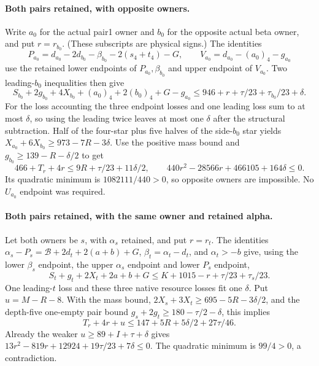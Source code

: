 \documentclass[11pt,letterpaper]{article}
\theoremstyle{definition}\newtheorem{definition}[theorem]{Definition}
\begin{document}
\paragraph{Both pairs retained, with opposite owners.}
Write $a_0$ for the actual pair1 owner and $b_0$ for the opposite actual
beta owner, and put $r=r_{b_0}$. (These subscripts are physical signs.)
The identities
\[
 P_{a_0}=d_{a_0}-2d_{b_0}-\beta_{b_0}-2(s_4+t_4)-G,
 \qquad V_{a_0}=d_{a_0}-(a_0)_4-g_{a_0}
\]
use the retained lower endpoints of $P_{a_0},\beta_{b_0}$ and upper
endpoint of $V_{a_0}$. Two leading-$b_0$ inequalities then give
\[
 S_{b_0}+2g_{b_0}+4X_{b_0}+(a_0)_4+2(b_0)_4+G-g_{a_0}
 \le946+r+\tau/23+\tau_{b_0}/23+\delta.
\]
For the loss accounting the three endpoint losses and one leading loss
sum to at most $\delta$, so using the leading twice leaves at most one
$\delta$ after the structural subtraction.
Half of the four-star plus five halves of the side-$b_0$ star yields
$X_{a_0}+6X_{b_0}\ge973-7R-3\delta$.
Use the positive mass bound and $g_{b_0}\ge139-R-\delta/2$ to get
\[
 466+T_r+4r\le9R+\tau/23+11\delta/2,
 \qquad440r^2-28566r+466105+164\delta\le0.
\]
Its quadratic minimum is $1082111/440>0$, so opposite owners are
impossible. No $U_{a_0}$ endpoint was required.

\paragraph{Both pairs retained, with the same owner and retained alpha.}
Let both owners be $s$, with $\alpha_s$ retained, and put $r=r_t$.
The identities
$\alpha_s-P_s=\mathcal B+2d_t+2(a+b)+G$,
$\beta_t=\alpha_t-d_t$, and $\alpha_t>-b$ give, using the
lower $\beta_s$ endpoint, the upper $\alpha_s$ endpoint and lower
$P_s$ endpoint,
\[
 S_t+g_t+2X_t+2a+b+G\le K+1015-r+\tau/23+\tau_s/23.
\]
One leading-$t$ loss and these three native resource losses fit one
$\delta$. Put $u=M-R-8$. With the mass bound,
$2X_s+3X_t\ge695-5R-3\delta/2$, and the depth-five one-empty pair
bound $g_s+2g_t\ge180-\tau/2-\delta$, this implies
\[
 T_r+4r+u\le147+5R+5\delta/2+27\tau/46.
\]
Already the weaker $u\ge89+I+\tau+\delta$ gives
$13r^2-819r+12924+19\tau/23+7\delta\le0$.
The quadratic minimum is $99/4>0$, a contradiction.
\end{document}
